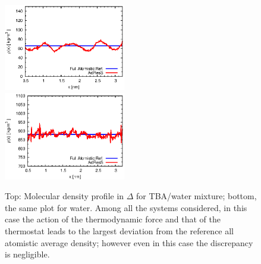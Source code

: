 \documentclass[a4paper,preprint,unsortedaddress]{revtex4-1}
\begin{document}
\begin{figure}
\center
\includegraphics[width=0.475\textwidth]{alcohol_rho.eps}\\
\includegraphics[width=0.475\textwidth]{water_rho.eps}
\caption{Top: Molecular density profile in $\Delta$ for TBA/water mixture; bottom, the same plot for water. Among all the systems considered, in this case the action of the thermodynamic force and that of the thermostat leads to the largest deviation from the reference all atomistic average density; however even in this case the discrepancy is negligible.\label{urea-TBA}}
\end{figure}
\end{document}

